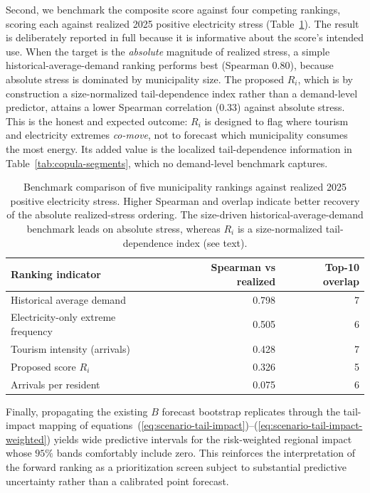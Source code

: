 \documentclass[11pt,a4paper]{article}
\begin{document}
Second, we benchmark the composite score against four competing rankings, scoring each against realized 2025 positive electricity stress (Table~\ref{tab:benchmark}). The result is deliberately reported in full because it is informative about the score's intended use. When the target is the \emph{absolute} magnitude of realized stress, a simple historical-average-demand ranking performs best (Spearman $0.80$), because absolute stress is dominated by municipality size. The proposed $R_i$, which is by construction a size-normalized tail-dependence index rather than a demand-level predictor, attains a lower Spearman correlation ($0.33$) against absolute stress. This is the honest and expected outcome: $R_i$ is designed to flag where tourism and electricity extremes \emph{co-move}, not to forecast which municipality consumes the most energy. Its added value is the localized tail-dependence information in Table~\ref{tab:copula-segments}, which no demand-level benchmark captures.

\begin{table}[H]
\centering
\small
\caption{Benchmark comparison of five municipality rankings against realized 2025 positive electricity stress. Higher Spearman and overlap indicate better recovery of the absolute realized-stress ordering. The size-driven historical-average-demand benchmark leads on absolute stress, whereas $R_i$ is a size-normalized tail-dependence index (see text).}
\label{tab:benchmark}
\begin{tabular}{lrr}
\toprule
Ranking indicator & Spearman vs realized & Top-10 overlap \\
\midrule
Historical average demand & 0.798 & 7 \\
Electricity-only extreme frequency & 0.505 & 6 \\
Tourism intensity (arrivals) & 0.428 & 7 \\
Proposed score $R_i$ & 0.326 & 5 \\
Arrivals per resident & 0.075 & 6 \\
\bottomrule
\end{tabular}
\end{table}

Finally, propagating the existing $B$ forecast bootstrap replicates through the tail-impact mapping of equations~(\ref{eq:scenario-tail-impact})--(\ref{eq:scenario-tail-impact-weighted}) yields wide predictive intervals for the risk-weighted regional impact whose $95\%$ bands comfortably include zero. This reinforces the interpretation of the forward ranking as a prioritization screen subject to substantial predictive uncertainty rather than a calibrated point forecast.
\end{document}
